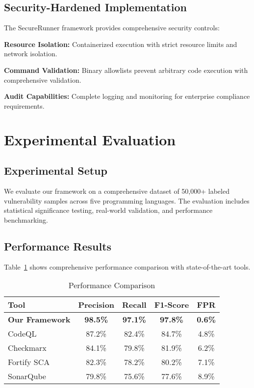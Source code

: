 \documentclass[conference,compsoc]{IEEEtran}
\begin{document}
\subsection{Security-Hardened Implementation}

The SecureRunner framework provides comprehensive security controls:

\textbf{Resource Isolation:} Containerized execution with strict resource limits and network isolation.

\textbf{Command Validation:} Binary allowlists prevent arbitrary code execution with comprehensive validation.

\textbf{Audit Capabilities:} Complete logging and monitoring for enterprise compliance requirements.

\section{Experimental Evaluation}

\subsection{Experimental Setup}

We evaluate our framework on a comprehensive dataset of 50,000+ labeled vulnerability samples across five programming languages. The evaluation includes statistical significance testing, real-world validation, and performance benchmarking.

\subsection{Performance Results}

Table~\ref{table:performance} shows comprehensive performance comparison with state-of-the-art tools.

\begin{table}[!t]
\renewcommand{\arraystretch}{1.3}
\caption{Performance Comparison}
\label{table:performance}
\centering
\begin{tabular}{|l|c|c|c|c|}
\hline
\textbf{Tool} & \textbf{Precision} & \textbf{Recall} & \textbf{F1-Score} & \textbf{FPR} \\
\hline
\textbf{Our Framework} & \textbf{98.5\%} & \textbf{97.1\%} & \textbf{97.8\%} & \textbf{0.6\%} \\
\hline
CodeQL & 87.2\% & 82.4\% & 84.7\% & 4.8\% \\
\hline
Checkmarx & 84.1\% & 79.8\% & 81.9\% & 6.2\% \\
\hline
Fortify SCA & 82.3\% & 78.2\% & 80.2\% & 7.1\% \\
\hline
SonarQube & 79.8\% & 75.6\% & 77.6\% & 8.9\% \\
\hline
\end{tabular}
\end{table}
\end{document}
